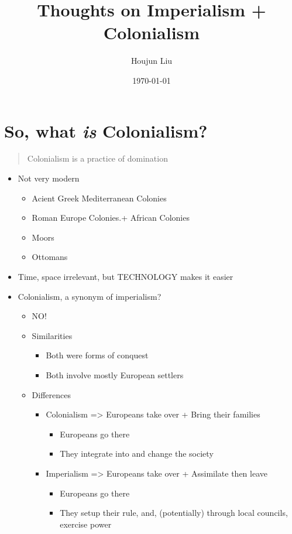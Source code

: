 \documentclass[letterpaper]{article}
\author{Houjun Liu}
\date{\today}
\title{Thoughts on Imperialism + Colonialism}
\renewcommand{\tableofcontents}{}
\begin{document}
\tableofcontents



\section{So, what \emph{is} Colonialism?}
\label{sec:orgad36a13}
\begin{quote}
Colonialism is a practice of domination
\end{quote}

\begin{itemize}
\item Not very modern

\begin{itemize}
\item Acient Greek Mediterranean Colonies
\item Roman Europe Colonies.+ African Colonies
\item Moors
\item Ottomans
\end{itemize}

\item Time, space irrelevant, but TECHNOLOGY makes it easier
\item Colonialism, a synonym of imperialism?

\begin{itemize}
\item NO!
\item Similarities

\begin{itemize}
\item Both were forms of conquest
\item Both involve mostly European settlers
\end{itemize}

\item Differences

\begin{itemize}
\item Colonialism => Europeans take over + Bring their families

\begin{itemize}
\item Europeans go there
\item They integrate into and change the society
\end{itemize}

\item Imperialism => Europeans take over + Assimilate then leave

\begin{itemize}
\item Europeans go there
\item They setup their rule, and, (potentially) through local
councils, exercise power
\end{itemize}


\end{itemize}
\end{itemize}
\end{itemize}
\end{document}
